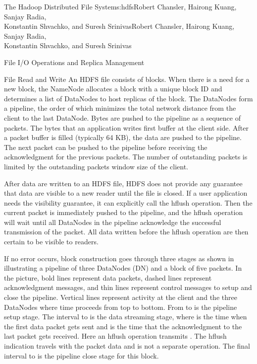 \begin{aosachaptertoc}{The Hadoop Distributed File System}{s:hdfs}{Robert Chansler, Hairong Kuang, Sanjay Radia, \\ Konstantin Shvachko, and Suresh Srinivas}{Robert Chansler, Hairong Kuang, Sanjay Radia, \\ \hspace*{0.9cm} Konstantin Shvachko, and Suresh Srinivas}
\begin{aosasect1}{File I/O Operations and Replica Management}
\begin{aosasect2}{File Read and Write}
An HDFS file consists of blocks. When there is a need for a new block,
the NameNode allocates a block with a unique block ID and determines a
list of DataNodes to host replicas of the block.  The DataNodes form a
pipeline, the order of which minimizes the total network distance from
the client to the last DataNode. Bytes are pushed to the pipeline as a
sequence of packets. The bytes that an application writes first buffer
at the client side. After a packet buffer is filled (typically 64 KB),
the data are pushed to the pipeline. The next packet can be pushed to
the pipeline before receiving the acknowledgment for the previous
packets.  The number of outstanding packets is limited by the
outstanding packets window size of the client.

After data are written to an HDFS file, HDFS does not provide any
guarantee that data are visible to a new reader until the file is
closed. If a user application needs the visibility guarantee, it can
explicitly call the hflush operation. Then the current packet is
immediately pushed to the pipeline, and the hflush operation will wait
until all DataNodes in the pipeline acknowledge the successful
transmission of the packet. All data written before the hflush
operation are then certain to be visible to readers.


If no error occurs, block construction goes through three stages as
shown in  illustrating a pipeline of three
DataNodes (DN) and a block of five packets.  In the picture, bold
lines represent data packets, dashed lines represent acknowledgment
messages, and thin lines represent control messages to setup and close
the pipeline. Vertical lines represent activity at the client and the
three DataNodes where time proceeds from top to bottom.  From
 to  is the pipeline setup stage. The interval
 to  is the data streaming stage, where  is
the time when the first data packet gets sent and  is the
time that the acknowledgment to the last packet gets received. Here an
hflush operation transmits .  The hflush indication
travels with the packet data and is not a separate operation. The
final interval  to  is the pipeline close stage for
this block.


\end{aosasect2}
\end{aosasect1}
\end{aosachaptertoc}

